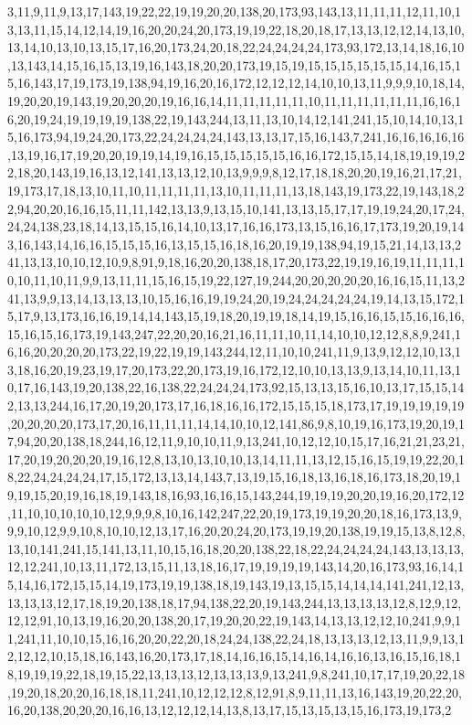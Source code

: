 3,11,9,11,9,13,17,143,19,22,22,19,19,20,20,138,20,173,93,143,13,11,11,11,12,11,10,13,13,11,15,14,12,14,19,16,20,20,24,20,173,19,19,22,18,20,18,17,13,13,12,12,14,13,10,13,14,10,13,10,13,15,17,16,20,173,24,20,18,22,24,24,24,24,173,93,172,13,14,18,16,10,13,143,14,15,16,15,13,19,16,143,18,20,20,173,19,15,19,15,15,15,15,15,15,14,16,15,15,16,143,17,19,173,19,138,94,19,16,20,16,172,12,12,12,14,10,10,13,11,9,9,9,10,18,14,19,20,20,19,143,19,20,20,20,19,16,16,14,11,11,11,11,11,10,11,11,11,11,11,11,16,16,16,20,19,24,19,19,19,19,138,22,19,143,244,13,11,13,10,14,12,141,241,15,10,14,10,13,15,16,173,94,19,24,20,173,22,24,24,24,24,143,13,13,17,15,16,143,7,241,16,16,16,16,16,13,19,16,17,19,20,20,19,19,14,19,16,15,15,15,15,15,16,16,172,15,15,14,18,19,19,19,22,18,20,143,19,16,13,12,141,13,13,12,10,13,9,9,9,8,12,17,18,18,20,20,19,16,21,17,21,19,173,17,18,13,10,11,10,11,11,11,11,13,10,11,11,11,13,18,143,19,173,22,19,143,18,22,94,20,20,16,16,15,11,11,142,13,13,9,13,15,10,141,13,13,15,17,17,19,19,24,20,17,24,24,24,138,23,18,14,13,15,15,16,14,10,13,17,16,16,173,13,15,16,16,17,173,19,20,19,143,16,143,14,16,16,15,15,15,16,13,15,15,16,18,16,20,19,19,138,94,19,15,21,14,13,13,241,13,13,10,10,12,10,9,8,91,9,18,16,20,20,138,18,17,20,173,22,19,19,16,19,11,11,11,10,10,11,10,11,9,9,13,11,11,15,16,15,19,22,127,19,244,20,20,20,20,20,16,16,15,11,13,241,13,9,9,13,14,13,13,13,10,15,16,16,19,19,24,20,19,24,24,24,24,24,19,14,13,15,172,15,17,9,13,173,16,16,19,14,14,143,15,19,18,20,19,19,18,14,19,15,16,16,15,15,16,16,16,15,16,15,16,173,19,143,247,22,20,20,16,21,16,11,11,10,11,14,10,10,12,12,8,8,9,241,16,16,20,20,20,20,173,22,19,22,19,19,143,244,12,11,10,10,241,11,9,13,9,12,12,10,13,13,18,16,20,19,23,19,17,20,173,22,20,173,19,16,172,12,10,10,13,13,9,13,14,10,11,13,10,17,16,143,19,20,138,22,16,138,22,24,24,24,173,92,15,13,13,15,16,10,13,17,15,15,142,13,13,244,16,17,20,19,20,173,17,16,18,16,16,172,15,15,15,18,173,17,19,19,19,19,19,20,20,20,20,173,17,20,16,11,11,11,14,14,10,10,12,141,86,9,8,10,19,16,173,19,20,19,17,94,20,20,138,18,244,16,12,11,9,10,10,11,9,13,241,10,12,12,10,15,17,16,21,21,23,21,17,20,19,20,20,20,19,16,12,8,13,10,13,10,10,13,14,11,11,13,12,15,16,15,19,19,22,20,18,22,24,24,24,24,17,15,172,13,13,14,143,7,13,19,15,16,18,13,16,18,16,173,18,20,19,19,19,15,20,19,16,18,19,143,18,16,93,16,16,15,143,244,19,19,19,20,20,19,16,20,172,12,11,10,10,10,10,10,12,9,9,9,8,10,16,142,247,22,20,19,173,19,19,20,20,18,16,173,13,9,9,9,10,12,9,9,10,8,10,10,12,13,17,16,20,20,24,20,173,19,19,20,138,19,19,15,13,8,12,8,13,10,141,241,15,141,13,11,10,15,16,18,20,20,138,22,18,22,24,24,24,24,143,13,13,13,12,12,241,10,13,11,172,13,15,11,13,18,16,17,19,19,19,19,143,14,20,16,173,93,16,14,15,14,16,172,15,15,14,19,173,19,19,138,18,19,143,19,13,15,15,14,14,14,141,241,12,13,13,13,13,12,17,18,19,20,138,18,17,94,138,22,20,19,143,244,13,13,13,13,12,8,12,9,12,12,12,91,10,13,19,16,20,20,138,20,17,19,20,20,22,19,143,14,13,13,12,12,10,241,9,9,11,241,11,10,10,15,16,16,20,20,22,20,18,24,24,138,22,24,18,13,13,13,12,13,11,9,9,13,12,12,12,10,15,18,16,143,16,20,173,17,18,14,16,16,15,14,16,14,16,16,13,16,15,16,18,18,19,19,19,22,18,19,15,22,13,13,13,12,13,13,13,9,13,241,9,8,241,10,17,17,19,20,22,18,19,20,18,20,20,16,18,18,11,241,10,12,12,12,8,12,91,8,9,11,11,13,16,143,19,20,22,20,16,20,138,20,20,20,16,16,13,12,12,12,14,13,8,13,17,15,13,15,13,15,16,173,19,173,2